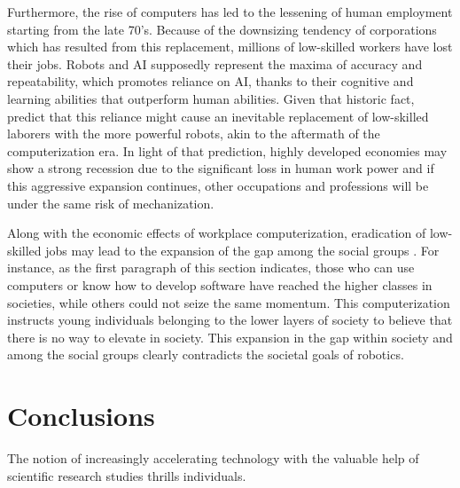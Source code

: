 \documentclass[man]{apa6}
\begin{document}
Furthermore, the rise of computers has led to the lessening of human employment starting from the late 70's.
Because of the downsizing tendency of corporations which has resulted from this replacement, millions of low-skilled workers have lost their jobs.
Robots and AI supposedly represent the maxima of accuracy and repeatability, which promotes reliance on AI, thanks to their cognitive and learning abilities that outperform human abilities.
Given that historic fact,  predict that this reliance might cause an inevitable replacement of low-skilled laborers with the more powerful robots, akin to the aftermath of the computerization era.
In light of that prediction, highly developed economies may show a strong recession due to the significant loss in human work power and if this aggressive expansion continues, other occupations and professions will be under the same risk of mechanization. \par

Along with the economic effects of workplace computerization, eradication of low-skilled jobs may lead to the expansion of the gap among the social groups \cite{gre}.
For instance, as the first paragraph of this section indicates, those who can use computers or know how to develop software have reached the higher classes in societies, while others could not seize the same momentum.
This computerization instructs young individuals belonging to the lower layers of society to believe that there is no way to elevate in society.
This expansion in the gap within society and among the social groups clearly contradicts the societal goals of robotics.

\section{Conclusions}
The notion of increasingly accelerating technology with the valuable help of scientific research studies thrills individuals.
\end{document}
